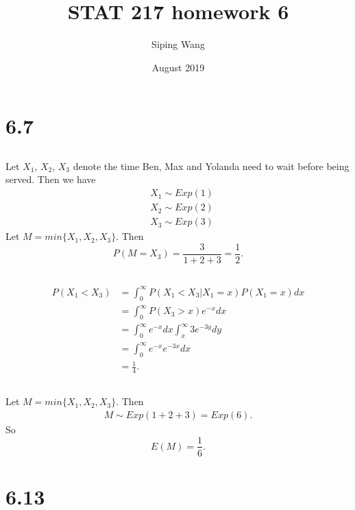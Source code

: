 \documentclass{article}
\title{STAT 217 homework 6}
\author{Siping Wang}
\date{August 2019}
\begin{document}
\maketitle

\section{6.7}
\subsection{}
Let $X_1$, $X_2$, $X_3$ denote the time Ben, Max and Yolanda need to wait before being served. Then we have
\begin{align*}
    &X_1 \sim Exp(1) \\
    &X_2 \sim Exp(2) \\
    &X_3 \sim Exp(3)
\end{align*}
Let $M=min\{X_1, X_2, X_3\}$. Then
\begin{equation*}
    P(M=X_3)=\frac{3}{1+2+3}=\frac{1}{2}.
\end{equation*}
\subsection{}
\begin{align*}
    P(X_1<X_3) &= \int_0^\infty P(X_1<X_3|X_1=x)P(X_1=x)dx \\
    &= \int_0^\infty P(X_3>x)e^{-x}dx \\
    &= \int_0^\infty e^{-x}dx \int_x^\infty 3e^{-3y}dy\\
    &= \int_0^\infty e^{-x} e^{-3x} dx \\
    &= \frac{1}{4}.
\end{align*}
\subsection{}
Let $M=min\{X_1, X_2, X_3\}$. Then
\begin{align*}
    M \sim Exp(1+2+3)=Exp(6).
\end{align*}
So
\begin{equation*}
    E(M) = \frac{1}{6}.
\end{equation*}

\section{6.13}
\end{document}
